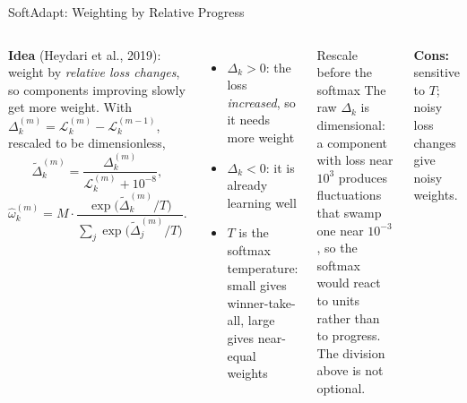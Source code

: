 \documentclass[aspectratio=169,11pt]{beamer}
\begin{document}
\begin{frame}{SoftAdapt: Weighting by Relative Progress}
\begin{columns}[T]
\textbf{Idea} (Heydari et al., 2019): weight by \emph{relative loss changes}, so components improving slowly get more weight. With $\Delta_k^{(m)} = \mathcal{L}_k^{(m)} - \mathcal{L}_k^{(m-1)}$, rescaled to be dimensionless,
\[
\tilde\Delta_k^{(m)} = \frac{\Delta_k^{(m)}}{\mathcal{L}_k^{(m)} + 10^{-8}},
\]
\[
\hat{\omega}_k^{(m)} = M \cdot \frac{\exp\bigl(\tilde\Delta_k^{(m)} / T\bigr)}{\sum_{j} \exp\bigl(\tilde\Delta_j^{(m)} / T\bigr)} .
\]

\begin{itemize}\itemsep1pt\footnotesize
    \item $\Delta_k > 0$: the loss \emph{increased}, so it needs more weight
    \item $\Delta_k < 0$: it is already learning well
    \item $T$ is the softmax temperature: small gives winner-take-all, large gives near-equal weights
\end{itemize}

\begin{alertblock}{Rescale before the softmax}
\footnotesize
The raw $\Delta_k$ is dimensional: a component with loss near $10^3$ produces fluctuations that swamp one near $10^{-3}$, so the softmax would react to units rather than to progress. The division above is not optional.
\end{alertblock}

\vspace{0.15cm}
{\footnotesize \textbf{Cons:} sensitive to $T$; noisy loss changes give noisy weights.}
\end{columns}
\end{frame}
\end{document}
